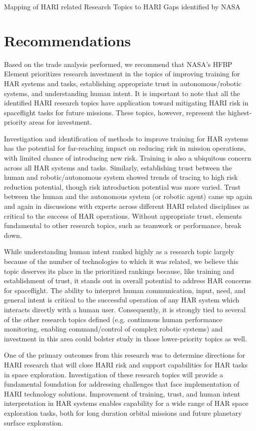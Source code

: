 \begin{table}[tb]
    \centering
    \caption{Mapping of HARI related Research Topics to HARI Gaps identified by NASA}
    \label{table:hari-gaps}
\end{table}

\section{Recommendations}
Based on the trade analysis performed, we recommend that NASA's HFBP Element prioritizes research investment in the topics of improving training for HAR systems and tasks, establishing appropriate trust in autonomous/robotic systems, and understanding human intent.
It is important to note that all the identified HARI research topics have application toward mitigating HARI risk in spaceflight tasks for future missions.
These topics, however, represent the highest-priority areas for investment.

Investigation and identification of methods to improve training for HAR systems has the potential for far-reaching impact on reducing risk in mission operations, with limited chance of introducing new risk.
Training is also a ubiquitous concern across all HAR systems and tasks.
Similarly, establishing trust between the human and robotic/autonomous system showed trends of tracing to high risk reduction potential, though risk introduction potential was more varied.
Trust between the human and the autonomous system (or robotic agent) came up again and again in discussions with experts across different HARI related disciplines as critical to the success of HAR operations.
Without appropriate trust, elements fundamental to other research topics, such as teamwork or performance, break down.

While understanding human intent ranked highly as a research topic largely because of the number of technologies to which it was related, we believe this topic deserves its place in the prioritized rankings because, like training and establishment of trust, it stands out in overall potential to address HAR concerns for spaceflight.
The ability to interpret human communication, input, need, and general intent is critical to the successful operation of any HAR system which interacts directly with a human user.
Consequently, it is strongly tied to several of the other research topics defined (e.g. continuous human performance monitoring, enabling command/control of complex robotic systems) and investment in this area could bolster study in those lower-priority topics as well.

One of the primary outcomes from this research was to determine directions for HARI research that will close HARI risk and support capabilities for HAR tasks in space exploration.
Investigation of these research topics will provide a fundamental foundation for addressing challenges that face implementation of HARI technology solutions.
Improvement of training, trust, and human intent interpretation in HAR systems enables capability for a wide range of HAR space exploration tasks, both for long duration orbital missions and future planetary surface exploration.
